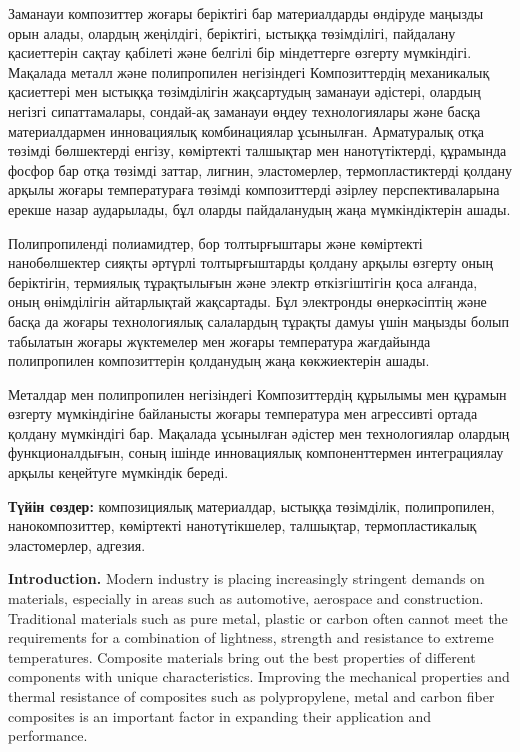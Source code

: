 Заманауи композиттер жоғары беріктігі бар материалдарды өндіруде маңызды
орын алады, олардың жеңілдігі, беріктігі, ыстыққа төзімділігі, пайдалану
қасиеттерін сақтау қабілеті және белгілі бір міндеттерге өзгерту
мүмкіндігі. Мақалада металл және полипропилен негізіндегі Композиттердің
механикалық қасиеттері мен ыстыққа төзімділігін жақсартудың заманауи
әдістері, олардың негізгі сипаттамалары, сондай-ақ заманауи өңдеу
технологиялары және басқа материалдармен инновациялық комбинациялар
ұсынылған. Арматуралық отқа төзімді бөлшектерді енгізу, көміртекті
талшықтар мен нанотүтіктерді, құрамында фосфор бар отқа төзімді заттар,
лигнин, эластомерлер, термопластиктерді қолдану арқылы жоғары
температураға төзімді композиттерді әзірлеу перспективаларына ерекше
назар аударылады, бұл оларды пайдаланудың жаңа мүмкіндіктерін ашады.

Полипропиленді полиамидтер, бор толтырғыштары және көміртекті
нанобөлшектер сияқты әртүрлі толтырғыштарды қолдану арқылы өзгерту оның
беріктігін, термиялық тұрақтылығын және электр өткізгіштігін қоса
алғанда, оның өнімділігін айтарлықтай жақсартады. Бұл электронды
өнеркәсіптің және басқа да жоғары технологиялық салалардың тұрақты дамуы
үшін маңызды болып табылатын жоғары жүктемелер мен жоғары температура
жағдайында полипропилен композиттерін қолданудың жаңа көкжиектерін
ашады.

Металдар мен полипропилен негізіндегі Композиттердің құрылымы мен
құрамын өзгерту мүмкіндігіне байланысты жоғары температура мен
агрессивті ортада қолдану мүмкіндігі бар. Мақалада ұсынылған әдістер мен
технологиялар олардың функционалдығын, соның ішінде инновациялық
компоненттермен интеграциялау арқылы кеңейтуге мүмкіндік береді.

{\bfseries Түйін сөздер:} композициялық материалдар, ыстыққа төзімділік,
полипропилен, нанокомпозиттер, көміртекті нанотүтікшелер, талшықтар,
термопластикалық эластомерлер, адгезия.

{\bfseries Introduction.} Modern industry is placing increasingly stringent
demands on materials, especially in areas such as automotive, aerospace
and construction. Traditional materials such as pure metal, plastic or
carbon often cannot meet the requirements for a combination of
lightness, strength and resistance to extreme temperatures. Composite
materials bring out the best properties of different components with
unique characteristics. Improving the mechanical properties and thermal
resistance of composites such as polypropylene, metal and carbon fiber
composites is an important factor in expanding their application and
performance.

